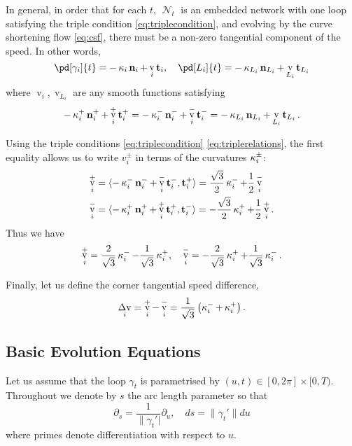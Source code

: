 \documentclass[11pt]{amsart}
\DeclareMathOperator{\tangspeed}{v}
\DeclareMathOperator{\network}{\mathcal{N}}
\DeclareMathOperator{\corneranglespeed}{{\Delta v}}
\begin{document}
In general, in order that for each \(t\), \(\network_t\) is an embedded network with one loop satisfying the triple condition \eqref{eq:triplecondition}, and evolving by the curve shortening flow \eqref{eq:csf}, there must be a non-zero tangential component of the speed. In other words,
\begin{equation}
\label{eq:csf_with_tang}
\pd[\gamma_i]{t} = -\curvecurv_i \nor_i + \tangspeed_i \tang_i, \quad \pd[L_i]{t} = -\curvecurv_{L_i} \nor_{L_i} + \tangspeed_{L_i} \tang_{L_i}
\end{equation}
where \(\tangspeed_i, \tangspeed_{L_i}\) are any smooth functions satisfying
\begin{equation}
\label{eq:speedcompatability}
-\curvecurv_i^+ \nor_i^+ + \tangspeed_i^+ \tang_i^+ = -\curvecurv_i^- \nor_i^- + \tangspeed_i^- \tang_i^- = -\curvecurv_{L_i} \nor_{L_i} + \tangspeed_{L_i} \tang_{L_i}.
\end{equation}

Using the triple conditions \eqref{eq:triplecondition} \eqref{eq:triplerelations}, the first equality allows us to write \(v_i^{\pm}\) in terms of the curvatures \(\operatorname{\kappa}_i^{\pm}\):
\begin{align*}
\tangspeed_i^+ &= \ip{-\curvecurv_i^- \nor_i^- + \tangspeed_i^- \tang_i^-}{\tang_i^+} = \frac{\sqrt{3}}{2} \curvecurv_i^- + \frac{1}{2} \tangspeed_i^- \\
\tangspeed_i^- &= \ip{-\curvecurv_i^+ \nor_i^+ + \tangspeed_i^+ \tang_i^+}{\tang_i^-} = - \frac{\sqrt{3}}{2} \curvecurv_i^+ + \frac{1}{2} \tangspeed_i^+.
\end{align*}
Thus we have
\begin{equation}
\label{eq:tangspeedcurvture}
\tangspeed_i^+ = \frac{2}{\sqrt{3}} \curvecurv_i^- - \frac{1}{\sqrt{3}} \curvecurv_i^+, \quad \tangspeed_i^- = -\frac{2}{\sqrt{3}} \curvecurv_i^+ + \frac{1}{\sqrt{3}} \curvecurv_i^-.
\end{equation}

Finally, let us define the corner tangential speed difference,
\[
\corneranglespeed_i = \tangspeed_i^+ - \tangspeed_i^- = \frac{1}{\sqrt{3}} \left(\curvecurv_i^- + \curvecurv_i^+\right).
\]

\subsection{Basic Evolution Equations}
\label{sec:orgheadline4}

Let us assume that the loop \(\gamma_t\) is parametrised by \((u, t) \in [0, 2\pi] \times [0, T)\). Throughout we denote by \(s\) the arc length parameter so that
\[
\partial_s = \frac{1}{\|\gamma_t'|} \partial_u, \quad ds = \|\gamma_t'\| du
\]
where primes denote differentiation with respect to \(u\).
\end{document}
